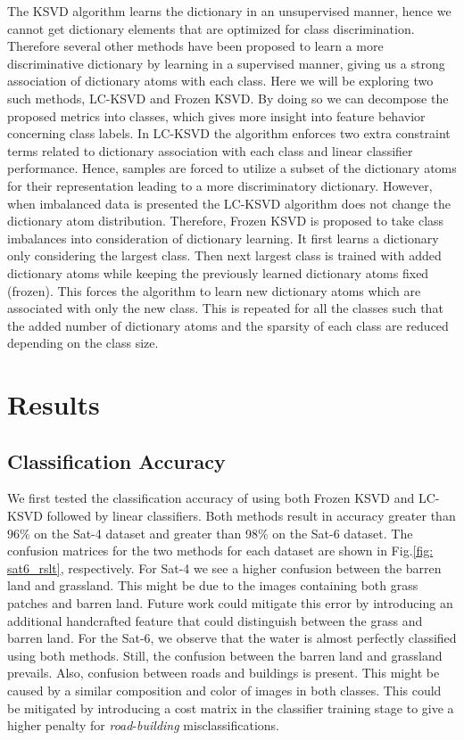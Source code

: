 The KSVD algorithm learns the dictionary in an unsupervised manner, hence we cannot get dictionary elements that are optimized for class discrimination. Therefore several other methods have been proposed to learn a more discriminative dictionary by learning in a supervised manner, giving us a strong association of dictionary atoms with each class. Here we will be exploring two such methods, LC-KSVD and Frozen KSVD\@. By doing so we can decompose the proposed metrics into classes, which gives more insight into feature behavior concerning class labels. In LC-KSVD the algorithm enforces two extra constraint terms related to dictionary association with each class and linear classifier performance. Hence, samples are forced to utilize a subset of the dictionary atoms for their representation leading to a more discriminatory dictionary. However, when imbalanced data is presented the LC-KSVD algorithm does not change the dictionary atom distribution. Therefore, Frozen KSVD is proposed to take class imbalances into consideration of dictionary learning. It first learns a dictionary only considering the largest class. Then next largest class is trained with added dictionary atoms while keeping the previously learned dictionary atoms fixed (frozen). This forces the algorithm to learn new dictionary atoms which are associated with only the new class. This is repeated for all the classes such that the added number of dictionary atoms and the sparsity of each class are reduced depending on the class size. 

\section{Results}

\subsection{Classification Accuracy}

We first tested the classification accuracy of using both Frozen KSVD and LC-KSVD followed by linear classifiers. Both methods result in accuracy greater than $96\%$ on the Sat-4 dataset and greater than 98\% on the Sat-6 dataset. The confusion matrices for the two methods for each dataset are shown in Fig.\ref{fig: sat6_rslt}, respectively. For Sat-4  we see a higher confusion between the barren land and grassland. This might be due to the images containing both grass patches and barren land. Future work could mitigate this error by introducing an additional handcrafted feature that could distinguish between the grass and barren land. For the Sat-6, we observe that the water is almost perfectly classified using both methods. Still, the confusion between the barren land and grassland prevails. Also, confusion between roads and buildings is present. This might be caused by a similar composition and color of images in both classes. This could be mitigated by introducing a cost matrix in the classifier training stage to give a higher penalty for \textit{road}-\textit{building} misclassifications. 

